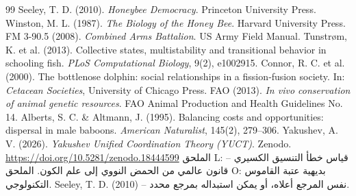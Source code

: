 \documentclass[12pt]{article}
\theoremstyle{remark}
\begin{document}
	\begin{thebibliography}{99}
		 Seeley, T. D. (2010). \emph{Honeybee Democracy}. Princeton University Press.
		 Winston, M. L. (1987). \emph{The Biology of the Honey Bee}. Harvard University Press.
		 FM 3-90.5 (2008). \emph{Combined Arms Battalion}. US Army Field Manual.
		 Tunstrøm, K. et al. (2013). Collective states, multistability and transitional behavior in schooling fish. \emph{PLoS Computational Biology}, 9(2), e1002915.
		 Connor, R. C. et al. (2000). The bottlenose dolphin: social relationships in a fission‑fusion society. In: \emph{Cetacean Societies}, University of Chicago Press.
		 FAO (2013). \emph{In vivo conservation of animal genetic resources}. FAO Animal Production and Health Guidelines No. 14.
		 Alberts, S. C. \& Altmann, J. (1995). Balancing costs and opportunities: dispersal in male baboons. \emph{American Naturalist}, 145(2), 279–306.
		 Yakushev, A. V. (2026). \emph{Yakushev Unified Coordination Theory (YUCT)}. Zenodo. \url{https://doi.org/10.5281/zenodo.18444599}
		 الملحق L: قياس خطأ التنسيق الكسيري – قانون عالمي من الحمض النووي إلى علم الكون.
		 الملحق O: بديهية عتبة القاموس التكنولوجي.
		 Seeley, T. D. (2010) – نفس المرجع أعلاه، أو يمكن استبداله بمرجع محدد.
	\end{thebibliography}
	
\end{document}
